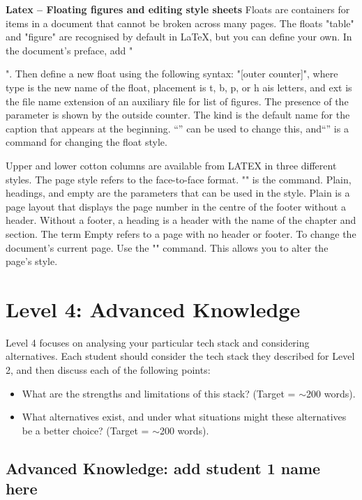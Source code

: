 \documentclass[a4paper, 11pt]{report}
\begin{document}
\textbf{Latex – Floating figures and editing style sheets}
Floats are containers for items in a document that cannot be broken across many pages. The floats "table" and "figure" are recognised by default in LaTeX, but you can define your own. In the document's preface, add "\usepackage{float}". Then define a new float using the following syntax: "[outer counter]", where type is the new name of the float, placement is t, b, p, or h ais letters, and ext is the file name extension of an auxiliary file for list of figures. The presence of the parameter is shown by the outside counter. The kind is the default name for the caption that appears at the beginning. “” can be used to change this, and“\thispagestyle” is a command for changing the float style.

Upper and lower cotton columns are available from LATEX in three different styles. The page style refers to the face-to-face format. "\pagestyle{style}" is the command. Plain, headings, and empty are the parameters that can be used in the style. Plain is a page layout that displays the page number in the centre of the footer without a header. Without a footer, a heading is a header with the name of the chapter and section. The term Empty refers to a page with no header or footer. To change the document's current page. Use the "" command. This allows you to alter the page's style.





\newpage
\section{Level 4: Advanced Knowledge}

Level 4 focuses on analysing your particular tech stack and considering alternatives. Each student should consider the tech stack they described for Level 2, and then discuss each of the following points:
\begin{itemize}
    \item What are the strengths and limitations of this stack? (Target = $\sim$200 words).
    \item What alternatives exist, and under what situations might these alternatives be a better choice? (Target = $\sim$200 words).
\end{itemize}

\subsection{Advanced Knowledge: add student 1 name here}
\end{document}
